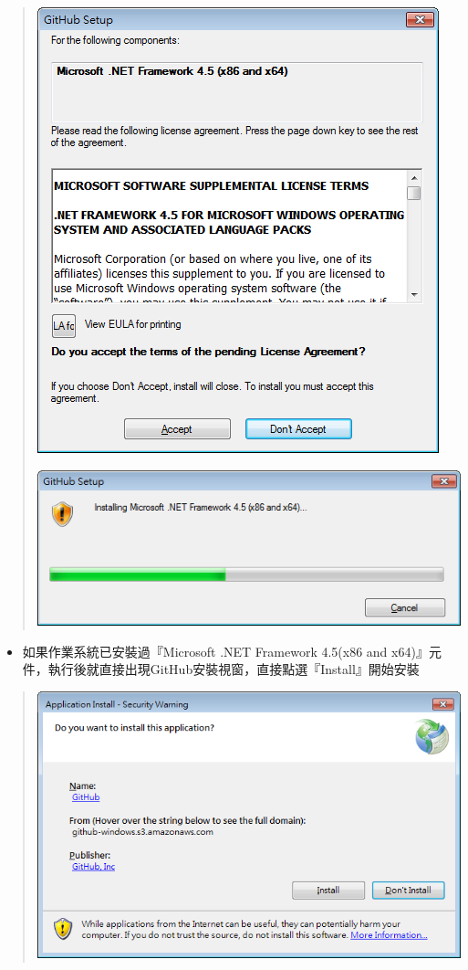 \documentclass[letterpaper,10pt,english]{sphinxmanual}
\begin{document}
\begin{quote}

{\hfill\includegraphics{GitHub-Install-002.png}\hfill}

\includegraphics{GitHub-Install-003.png}
\end{quote}
\begin{itemize}
\item {} 
如果作業系統已安裝過『Microsoft .NET Framework 4.5(x86 and x64)』元件，執行後就直接出現GitHub安裝視窗，直接點選『Install』開始安裝

\end{itemize}
\begin{quote}

\includegraphics{GitHub-Install-004.png}
\end{quote}
\end{document}
